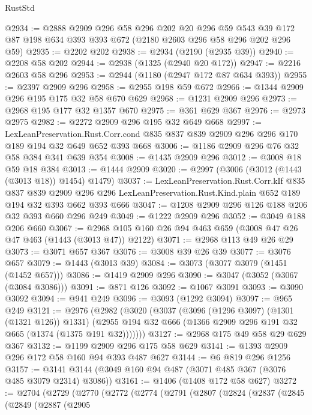 \begin{lexlean}{RustStd}
\begin{coremodule}
@2934 := @2888
    @2909
    @296
    @58
    @296
    @202
    @20
    @296
    @59
    @543
    @39
    @172
    @87
    @198
    @634
    @393
    @393
    @672
    (@2180 @2603 @296 @58 @296 @202 @296 @59)
@2935 := @2202 @202
@2938 := @2934 (@2190 (@2935 @39))
@2940 := @2208 @58 @202
@2944 := @2938 (@1325 (@2940 @20 @172))
@2947 := @2216 @2603 @58 @296
@2953 := @2944 (@1180 (@2947 @172 @87 @634 @393))
@2955 := @2397 @2909 @296
@2958 := @2955 @198 @59 @672
@2966 := @1344 @2909 @296 @195 @175 @32 @58 @670 @629
@2968 := @1231 @2909 @296
@2973 := @2968 @195 @177 @32 @1357 @670
@2975 := @361 @629 @367
@2976 := @2973 @2975
@2982 := @2272 @2909 @296 @195 @32 @649 @668
@2997 := LexLeanPreservation.Rust.Corr.cond
    @835
    @837
    @839
    @2909
    @296
    @296
    @170
    @189
    @194
    @32
    @649
    @652
    @393
    @668
@3006 := @1186 @2909 @296 @76 @32 @58 @384 @341 @639 @354
@3008 := @1435 @2909 @296
@3012 := @3008 @18 @59 @18 @384
@3013 := @1444 @2909
@3020 := @2997 (@3006 (@3012 (@1443 (@3013 @18)) @1454) @1479)
@3037 := LexLeanPreservation.Rust.Corr.kIf
    @835
    @837
    @839
    @2909
    @296
    @296
    LexLeanPreservation.Rust.Kind.plain
    @652
    @189
    @194
    @32
    @393
    @662
    @393
    @666
@3047 := @1208 @2909 @296 @126 @188 @206 @32 @393 @660 @296 @249
@3049 := @1222 @2909 @296
@3052 := @3049 @188 @206 @660
@3067 := @2968 @105 @160 @26 @94 @463 @659 (@3008 @47 @26 @47 @463 (@1443 (@3013 @47)) @2122)
@3071 := @2968 @113 @49 @26 @29
@3073 := @3071 @657 @367
@3076 := @3008 @39 @26 @39
@3077 := @3076 @657
@3079 := @1443 (@3013 @39)
@3084 := @3073 (@3077 @3079 (@1451 (@1452 @657)))
@3086 := @1419 @2909 @296
@3090 := @3047 (@3052 (@3067 (@3084 @3086)))
@3091 := @871 @126
@3092 := @1067 @3091
@3093 := @3090 @3092
@3094 := @941 @249
@3096 := @3093 (@1292 @3094)
@3097 := @965 @249
@3121 := @2976
    (@2982
      (@3020
        (@3037
          (@3096 (@1296 @3097) (@1301 (@1321 @126)) @1331)
          (@2955 @194 @32 @666 (@1366 @2909 @296 @191 @32 @665 (@1374 (@1375 @191 @32)))))))
@3127 := @2968 @175 @49 @58 @29 @629 @367
@3132 := @1199 @2909 @296 @175 @58 @629
@3141 := @1393 @2909 @296 @172 @58 @160 @94 @393 @487 @627
@3144 := @6 @819 @296 @1256
@3157 := @3141 @3144 (@3049 @160 @94 @487 (@3071 @485 @367 (@3076 @485 @3079 @2314) @3086))
@3161 := @1406 (@1408 @172 @58 @627)
@3272 := @2704
    (@2729
      (@2770
        (@2772
          (@2774
            (@2791
              (@2807
                (@2824
                  (@2837
                    (@2845
                      (@2849
                        (@2887
                          (@2905

\end{coremodule}
\end{lexlean}

